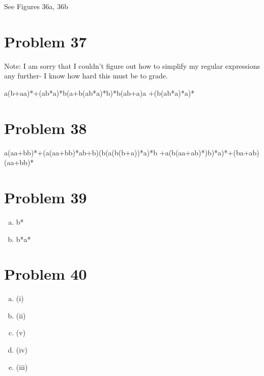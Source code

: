 \documentclass[11pt]{article}
\begin{document}
See Figures 36a, 36b

\section*{Problem 37}

Note: I am sorry that I couldn't figure out how to simplify my regular expressions any further- I know how hard this must be to grade.

a(b+aa)*+(ab*a)*b(a+b(ab*a)*b)*b(ab+a)a +(b(ab*a)*a)*

\section*{Problem 38}

a(aa+bb)*+(a(aa+bb)*ab+b)(b(a(b(b+a))*a)*b +a(b(aa+ab)*)b)*a)*+(ba+ab)(aa+bb)*

\section*{Problem 39}

\begin{enumerate}[(a)]
	\item b*
	\item b*a*
	
\end{enumerate}

\section*{Problem 40}

\begin{enumerate}[(a)]
	\item (i)
	\item (ii)
	\item (v)
	\item (iv)
	\item (iii)
	
\end{enumerate}
\end{document}
